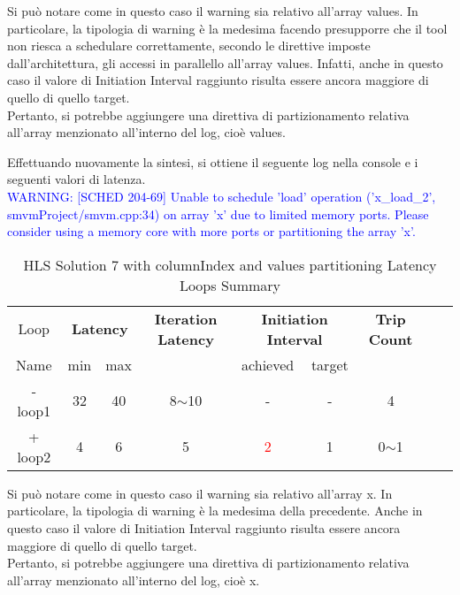 Si può notare come in questo caso il warning sia relativo all'array values. In particolare, la tipologia di warning è la medesima facendo presupporre che il tool non riesca a schedulare correttamente, secondo le direttive imposte dall'architettura, gli accessi in parallello all'array values. Infatti, anche in questo caso il valore di Initiation Interval raggiunto risulta essere ancora maggiore di quello di quello target. 
\\
Pertanto, si potrebbe aggiungere una direttiva di partizionamento relativa all'array menzionato all'interno del log, cioè values.



Effettuando nuovamente la sintesi, si ottiene il seguente log nella console e i seguenti valori di latenza.
\\
\textcolor{blue}{WARNING: [SCHED 204-69] Unable to schedule 'load' operation ('x\_load\_2', smvmProject/smvm.cpp:34) on array 'x' due to limited memory ports. Please consider using a memory core with more ports or partitioning the array 'x'.}

\begin{table}[H]
	\centering
	\begin{tabular}{|c|c|c|c|c|c|c|c|c|}
		\hline
		\multicolumn{1}{|c|}{Loop} & \multicolumn{2}{|c|}{\textbf{Latency}} & \multicolumn{1}{c|}{\textbf{Iteration Latency}} & \multicolumn{2}{c|}{\textbf{Initiation Interval}} & \multicolumn{1}{c|}{\textbf{Trip Count}}  \\
		Name & min & max &  & achieved & target &  \\
		\hline
		- loop1 & 32 & 40 & 8$\sim$10 & - & - & 4 \\
		+ loop2 & 4 & 6 & 5 & \textcolor{red}{2} & 1 & 0$\sim$1 \\
		\hline
	\end{tabular}
	\caption{HLS Solution 7 with columnIndex and values partitioning Latency Loops Summary}
	\label{tab:hls-solution-7-columnindex-values-partitioning-loop-summary}
\end{table}

Si può notare come in questo caso il warning sia relativo all'array x. In particolare, la tipologia di warning è la medesima della precedente. Anche in questo caso il valore di Initiation Interval raggiunto risulta essere ancora maggiore di quello di quello target. 
\\
Pertanto, si potrebbe aggiungere una direttiva di partizionamento relativa all'array menzionato all'interno del log, cioè x.

